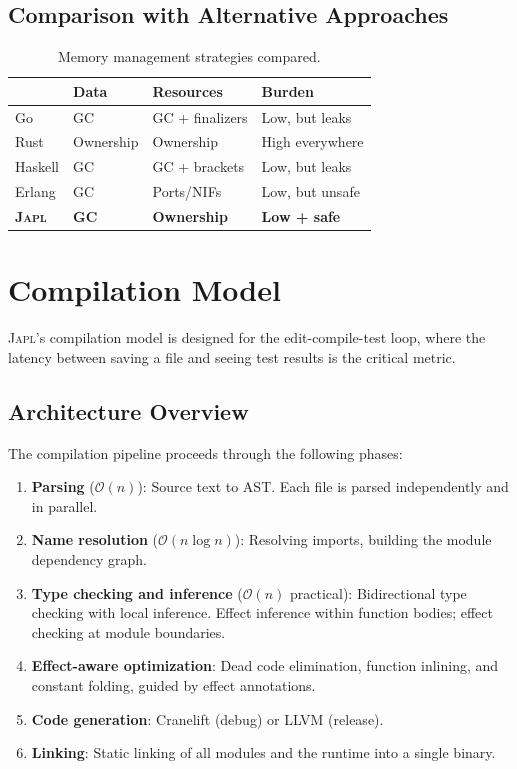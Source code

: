 \documentclass[11pt,twocolumn]{article}
\newcommand{\japl}{\textsc{Japl}}
\newcommand{\BigO}{\mathcal{O}}
\begin{document}
\subsection{Comparison with Alternative Approaches}

\begin{table}[H]
\centering
\scriptsize
\begin{tabularx}{\columnwidth}{lXXX}
\toprule
& \textbf{Data} & \textbf{Resources} & \textbf{Burden} \\
\midrule
Go & GC & GC + finalizers & Low, but leaks \\
Rust & Ownership & Ownership & High everywhere \\
Haskell & GC & GC + brackets & Low, but leaks \\
Erlang & GC & Ports/NIFs & Low, but unsafe \\
\textbf{\japl{}} & \textbf{GC} & \textbf{Ownership} & \textbf{Low + safe} \\
\bottomrule
\end{tabularx}
\caption{Memory management strategies compared.}
\label{tab:memory-comparison}
\end{table}

\section{Compilation Model}
\label{sec:compilation}

\japl{}'s compilation model is designed for the edit-compile-test loop, where the latency between saving a file and seeing test results is the critical metric.

\subsection{Architecture Overview}

The compilation pipeline proceeds through the following phases:

\begin{enumerate}
\item \textbf{Parsing} ($\BigO(n)$): Source text to AST. Each file is parsed independently and in parallel.
\item \textbf{Name resolution} ($\BigO(n \log n)$): Resolving imports, building the module dependency graph.
\item \textbf{Type checking and inference} ($\BigO(n)$ practical): Bidirectional type checking with local inference. Effect inference within function bodies; effect checking at module boundaries.
\item \textbf{Effect-aware optimization}: Dead code elimination, function inlining, and constant folding, guided by effect annotations.
\item \textbf{Code generation}: Cranelift (debug) or LLVM (release).
\item \textbf{Linking}: Static linking of all modules and the runtime into a single binary.
\end{enumerate}
\end{document}
